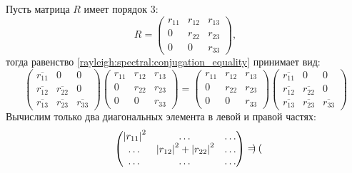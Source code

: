 \begin{example}
    Пусть матрица $R$ имеет порядок 3:
    \[
        R
        = \begin{pmatrix}
              r_{11} & r_{12} & r_{13} \\
              0      & r_{22} & r_{23} \\
              0      & 0      & r_{33}
        \end{pmatrix},
    \]
    тогда равенство \eqref{rayleigh:spectral:conjugation_equality} принимает вид:
    \[
        \begin{pmatrix}
            \overline{r_{11}} & 0                 & 0                 \\
            \overline{r_{12}} & \overline{r_{22}} & 0                 \\
            \overline{r_{13}} & \overline{r_{23}} & \overline{r_{33}}
        \end{pmatrix}
        \begin{pmatrix}
            r_{11} & r_{12} & r_{13} \\
            0      & r_{22} & r_{23} \\
            0      & 0      & r_{33}
        \end{pmatrix}
        =
        \begin{pmatrix}
            r_{11} & r_{12} & r_{13} \\
            0      & r_{22} & r_{23} \\
            0      & 0      & r_{33}
        \end{pmatrix}
        \begin{pmatrix}
            \overline{r_{11}} & 0                 & 0                 \\
            \overline{r_{12}} & \overline{r_{22}} & 0                 \\
            \overline{r_{13}} & \overline{r_{23}} & \overline{r_{33}}
        \end{pmatrix}
    \]
    Вычислим только два диагональных элемента в левой и правой частях:
    \[
        \begin{pmatrix}
            \left | r_{11} \right |^2 & \dots                                   & \dots \\
            \dots              & \left | r_{12} \right |^2 + \left | r_{22} \right |^2 & \dots \\
            \dots              & \dots                                   & \dots
        \end{pmatrix}
        =
        \begin{pmatrix}

\end{pmatrix}\]
\end{example}
